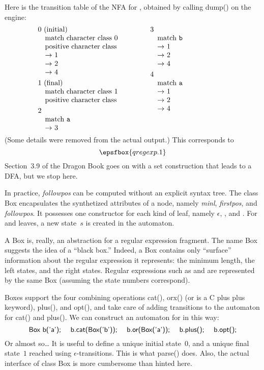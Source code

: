 Here is the transition table of the NFA for , obtained by calling
{\sf dump()} on the engine:
  $$\vtop{\hsize=0.4\hsize\obeylines
    $0$ (initial)
    \quad match character class $0$
    \quad positive character class
    \quad $\rightarrow$ $1$
    \quad $\rightarrow$ $2$
    \quad $\rightarrow$ $4$
  \smallskip
    $1$ (final)
    \quad match character class $1$
    \quad positive character class
  \smallskip
    $2$
    \quad match {\tt a}
    \quad $\rightarrow$ $3$
  }\qquad\vtop{\hsize=0.4\hsize\obeylines
    $3$
    \quad match {\tt b}
    \quad $\rightarrow$ $1$
    \quad $\rightarrow$ $2$
    \quad $\rightarrow$ $4$
  \smallskip
    $4$
    \quad match {\tt a}
    \quad $\rightarrow$ $1$
    \quad $\rightarrow$ $2$
    \quad $\rightarrow$ $4$
  }$$
(Some details were removed from the actual output.) This corresponds to
  $$\epsfbox{qregexp.1}$$
Section~3.9 of the Dragon Book goes on with a set construction that leads to a
DFA, but we stop here.

In practice, {\it followpos\/} can be computed without an explicit syntax tree.
The class {\sf Box} encapsulates the synthetized attributes of a node, namely
{\it minl}, {\it firstpos}, and {\it followpos}. It possesses one constructor
for each kind of leaf, namely $\epsilon$, , and . For
 and  leaves, a new state~$s$ is created in the
automaton.

A {\sf Box} is, really, an abstraction for a regular expression fragment. The
name {\sf Box} suggests the idea of a ``black box.'' Indeed, a {\sf Box}
contains only ``surface'' information about the regular expression it
represents: the minimum length, the left states, and the right states. Regular
expressions such as  and  are represented by the same {\sf
Box} (assuming the state numbers correspond).

Boxes support the four combining operations {\sf cat()}, {\sf orx()} ({\sf or}
is a C plus plus keyword), {\sf plus()}, and {\sf opt()}, and take care of
adding transitions to the automaton for {\sf cat()} and {\sf plus()}. We can
construct an automaton for  in this way:
  $$\hbox{\sf Box b('a'); \quad b.cat(Box('b')); \quad b.or(Box('a'));
    \quad b.plus(); \quad b.opt();}$$
Or almost so\dots{} It is useful to define a unique initial
state~$0$, and a unique final state~$1$ reached using $\epsilon$-transitions.
This is what {\sf parse()} does. Also, the actual interface of class {\sf Box}
is more cumbersome than hinted here.

